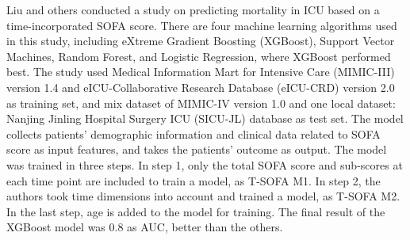 \documentclass[12pt,a4paper,english
]{tunithesis}
\begin{document}
Liu and others conducted a study on predicting mortality in ICU based on a time-incorporated SOFA score.\parencite{liu2022} There are four machine learning algorithms used in this study, including eXtreme Gradient Boosting (XGBoost), Support Vector Machines, Random Forest, and Logistic Regression, where XGBoost performed best. The study used Medical Information Mart for Intensive Care (MIMIC-III) version 1.4 and eICU-Collaborative Research Database (eICU-CRD) version 2.0 as training set, and mix dataset of MIMIC-IV version 1.0 and one local dataset: Nanjing Jinling Hospital Surgery ICU (SICU-JL) database as test set. The model collects patients' demographic information and clinical data related to SOFA score as input features, and takes the patients' outcome as output. The model was trained in three steps. In step 1, only the total SOFA score and sub-scores at each time point are included to train a model, as T-SOFA M1. In step 2, the authors took time dimensions into account and trained a model, as T-SOFA M2. In the last step, age is added to the model for training. The final result of the XGBoost model was 0.8 as AUC, better than the others.
\end{document}
